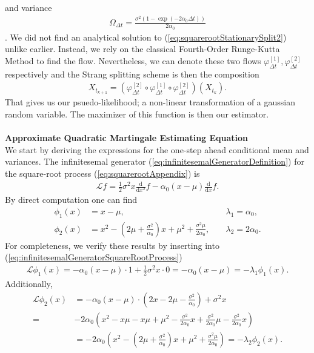 and variance
\begin{align}
     \Omega_{\Delta t} = \frac{\sigma^2\left(1 - \exp\left(-2\alpha_0 \Delta t\right)\right)}{2\alpha_0}
\end{align}
\cite[(5), (6)]{SplittingSchemes}. We did not find an analytical solution to (\ref{eq:squarerootStationarySplit2}) unlike earlier. Instead, we rely  on the classical Fourth-Order Runge-Kutta Method \cite[p. 541]{numericalAnalysis} to find the flow. Nevertheless, we can denote these two flows $\varphi_{\Delta t}^{[1]}, \varphi_{\Delta t}^{[2]}$ respectively and the Strang splitting scheme is then the composition
\begin{align}
    X_{t_{k + 1}} = \left(\varphi_{\Delta t}^{[2]} \circ \varphi_{\Delta t}^{[1]} \circ \varphi_{\Delta t}^{[2]}\right)\left(X_{t_k}\right).
\end{align}
That gives us our psuedo-likelihood; a non-linear transformation of a gaussian random variable. The maximizer of this function is then our estimator. \\\\
\noindent \textbf{Approximate Quadratic Martingale Estimating Equation}\\
We start by deriving the expressions for the one-step ahead conditional mean and variances. The infinitesemal generator (\ref{eq:infinitesemalGeneratorDefinition}) for the square-root process (\ref{eq:squarerootAppendix}) is 
\begin{align}
    \mathcal{L}f = \frac{1}{2}\sigma^2x\frac{\mathrm{d}}{\mathrm{d}x^2}f -\alpha_0\left(x - \mu\right)\frac{\mathrm{d}}{\mathrm{d}x}f. \label{eq:infinitesemalGeneratorSquareRootProcess}
\end{align}
By direct computation one can find 
\begin{align}
    \phi_1(x) &= x-\mu, &&\; \lambda_1 = \alpha_0, \label{squarerooteigen1}\\
    \phi_2(x) &= x^2 - \left(2\mu + \frac{\sigma^2}{\alpha_0}\right)x + \mu^2 + \frac{\sigma^2\mu}{2\alpha_0}, &&\; \lambda_2 = 2\alpha_0. \label{squarerooteigen2}
\end{align}
For completeness, we verify these results by inserting into (\ref{eq:infinitesemalGeneratorSquareRootProcess})
\begin{align}
    \mathcal{L}\phi_1(x) = -\alpha_0\left(x - \mu\right)\cdot 1 + \frac{1}{2}\sigma^2 x \cdot 0 = -\alpha_0\left(x - \mu\right) = -\lambda_1\phi_1(x). \label{eq:directVerificationCondMean}
\end{align}
Additionally,
\begin{align}
    \mathcal{L}\phi_2(x) &= -\alpha_0\left(x - \mu\right)\cdot \left(2x -2\mu - \frac{\sigma^2}{\alpha_0}\right) + \sigma^2x\\
    =& -2\alpha_0\left(x^2-x\mu - x\mu + \mu^2 -\frac{\sigma^2}{2\alpha_0}x + \frac{\sigma^2}{2\alpha_0}\mu - \frac{\sigma^2}{2\alpha_0}x \right)\\
    &= -2\alpha_0 \left(x^2 -\left(2\mu+\frac{\sigma^2}{\alpha_0}\right)x + \mu^2 + \frac{\sigma^2\mu}{2\alpha_0}\right) = -\lambda_2\phi_2(x).\\
\end{align}
